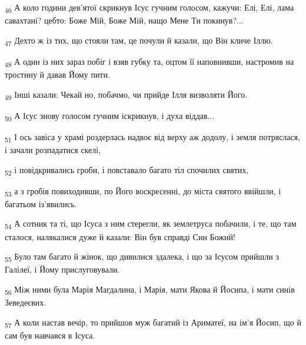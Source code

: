 \begin{tcolorbox}
\textsubscript{46} А коло години дев'ятої скрикнув Ісус гучним голосом, кажучи: Елі, Елі, лама савахтані? цебто: Боже Мій, Боже Мій, нащо Мене Ти покинув?...
\end{tcolorbox}
\begin{tcolorbox}
\textsubscript{47} Дехто ж із тих, що стояли там, це почули й казали, що Він кличе Іллю.
\end{tcolorbox}
\begin{tcolorbox}
\textsubscript{48} А один із них зараз побіг і взяв губку та, оцтом її наповнивши, настромив на тростину й давав Йому пити.
\end{tcolorbox}
\begin{tcolorbox}
\textsubscript{49} Інші казали: Чекай но, побачмо, чи прийде Ілля визволяти Його.
\end{tcolorbox}
\begin{tcolorbox}
\textsubscript{50} А Ісус знову голосом гучним іскрикнув, і духа віддав...
\end{tcolorbox}
\begin{tcolorbox}
\textsubscript{51} І ось завіса у храмі роздерлась надвоє від верху аж додолу, і земля потряслася, і зачали розпадатися скелі,
\end{tcolorbox}
\begin{tcolorbox}
\textsubscript{52} і повідкривались гроби, і повставало багато тіл спочилих святих,
\end{tcolorbox}
\begin{tcolorbox}
\textsubscript{53} а з гробів повиходивши, по Його воскресенні, до міста святого ввійшли, і багатьом із'явились.
\end{tcolorbox}
\begin{tcolorbox}
\textsubscript{54} А сотник та ті, що Ісуса з ним стерегли, як землетруса побачили, і те, що там сталося, налякалися дуже й казали: Він був справді Син Божий!
\end{tcolorbox}
\begin{tcolorbox}
\textsubscript{55} Було там багато й жінок, що дивилися здалека, і що за Ісусом прийшли з Галілеї, і Йому прислуговували.
\end{tcolorbox}
\begin{tcolorbox}
\textsubscript{56} Між ними була Марія Магдалина, і Марія, мати Якова й Йосипа, і мати синів Зеведеєвих.
\end{tcolorbox}
\begin{tcolorbox}
\textsubscript{57} А коли настав вечір, то прийшов муж багатий із Ариматеї, на ім'я Йосип, що й сам був навчався в Ісуса.
\end{tcolorbox}
